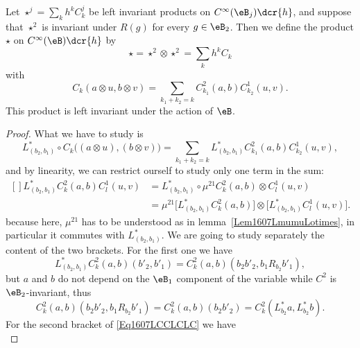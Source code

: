 \begin{theorem}
	Let $\star^j=\sum_kh^kC_k^j$ be left invariant products on $ C^{\infty}(\eB_j)\dcr{h}$, and suppose that $\star^2$ is invariant under $R(g)$ for every $g\in \eB_2$. Then we define the product $\star$ on $ C^{\infty}(\eB)\dcr{h}$ by
	\begin{equation}
		\star=\star^2\otimes\star^2=\sum_kh^kC_k
	\end{equation}
	with
	\begin{equation}
		C_k(a\otimes u,b\otimes v)=\sum_{k_1+k_2=k}C_{k_1}^2(a,b)C^1_{k_2}(u,v).
	\end{equation}
	This product is left invariant under the action of $\eB$.
\end{theorem}

\begin{proof}
	What we have to study is
	\begin{equation}
		L^*_{(b_2,b_1)}\circ C_k\big( (a\otimes u),(b\otimes v) \big)=\sum_{k_1+k_2=k}L^*_{(b_2,b_1)}C^2_{k_1}(a,b)C^1_{k_2}(u,v),
	\end{equation}
	and by linearity, we can restrict ourself to study only one term in the sum:
	\begin{equation}		\label{Eq1607LCCLCLC}
		\begin{aligned}[]
			L^*_{(b_2,b_1)}C_k^2(a,b)C_l^1(u,v)&=L^*_{(b_2,b_1)}\circ\mu^{21}C^2_k(a,b)\otimes C^1_l(u,v)\\
			&=\mu^{21}\Big[ L^*_{(b_2,b_1)}C^2_k(a,b) \Big]\otimes\Big[ L^*_{(b_2,b_1)}C_l^1(u,v) \Big].
		\end{aligned}
	\end{equation}
	because here, $\mu^{21}$ has to be understood as in lemma~\ref{Lem1607LmumuLotimes}, in particular it commutes with $L^*_{(b_2,b_1)}$. We are going to study separately the content of the two brackets. For the first one we have
	\begin{equation}
		L^*_{(b_2,b_1)}C^2_k(a,b)(b'_2,b'_1)=C^2_k(a,b)(b_2b'_2,b_1R_{b_2}b'_1),
	\end{equation}
	but $a$ and $b$ do not depend on the $\eB_1$ component of the variable while $C^2$ is $\eB_2$-invariant, thus
	\begin{equation}	\label{Eq1607BrackUnMu}
		C^2_k(a,b)(b_2b'_2,b_1R_{b_2}b'_1)=C^2_k(a,b)(b_2b'_2)
		=C^2_k(L^*_{b_2}a,L^*_{b_2}b).
	\end{equation}
	For the second bracket of \eqref{Eq1607LCCLCLC} we have
	\begin{equation}		\label{1607BrackDeuxMu}

\end{equation}
\end{proof}

